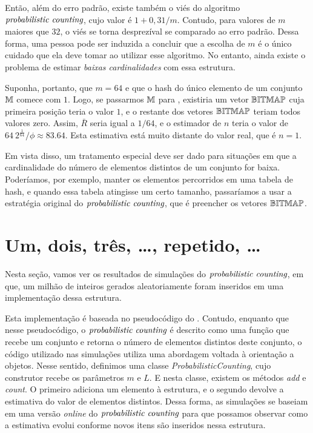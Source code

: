 Então, além do erro padrão, existe também o viés do algoritmo $\textit{probabilistic counting}$, cujo valor é $1 + 0{,}31/m$. Contudo, para 
valores de $m$ maiores que $32$, o viés se torna desprezíval se comparado ao erro padrão. Dessa forma, uma pessoa pode 
ser induzida a concluir que a escolha de $m$ é o único cuidado que ela deve tomar ao utilizar esse algoritmo. No 
entanto, ainda existe o problema de estimar \textit{baixas cardinalidades} com essa estrutura.

Suponha, portanto, que $m = 64$ e que o hash do único elemento de um conjunto $\mathbb{M}$ comece com $1$. Logo, se passarmos 
$\mathbb{M}$ para , existiria um vetor $\mathbb{BITMAP}$ cuja primeira posição teria o valor $1$, e o 
restante dos vetores $\mathbb{BITMAP}$ teriam todos valores zero. Assim, $\bar{R}$ seria igual a $1/64$, e o estimador de $n$ 
teria o valor de $64 \ 2^{\frac{1}{64}}/\phi \approx 83.64$. Esta estimativa está muito distante do valor real, que é 
$n = 1$.

Em vista disso, um tratamento especial deve ser dado para situações em que a cardinalidade do número de elementos 
distintos de um conjunto for baixa. Poderíamos, por exemplo, manter os elementos percorridos em uma tabela de hash, e 
quando essa tabela atingisse um certo tamanho, passaríamos a usar a estratégia original do $\textit{probabilistic counting}$, que é preencher
os vetores $\mathbb{BITMAP}$.  

\section{Um, dois, três, \dots, repetido, \dots}

Nesta seção, vamos ver os resultados de simulações do $\textit{probabilistic counting}$, em que, um milhão de inteiros gerados 
aleatoriamente foram inseridos em uma implementação dessa estrutura. 

Esta implementação é baseada no pseudocódigo do . Contudo, enquanto que 
nesse pseudocódigo, o $\textit{probabilistic counting}$ é descrito como uma função que recebe um conjunto e retorna o número de elementos 
distintos deste conjunto, o código utilizado nas simulações utiliza uma abordagem voltada à orientação a objetos. Nesse 
sentido, definimos uma classe \textit{ProbabilisticCounting}, cujo construtor recebe os parâmetros $m$ e $L$. E nesta 
classe, existem os métodos \textit{add} e \textit{count}. O primeiro adiciona um elemento à estrutura, e o segundo 
devolve a estimativa do valor de elementos distintos. Dessa forma, as simulações se baseiam em uma versão 
\textit{online} do $\textit{probabilistic counting}$ para que possamos observar como a estimativa evolui conforme novos itens são inseridos 
nessa estrutura.


